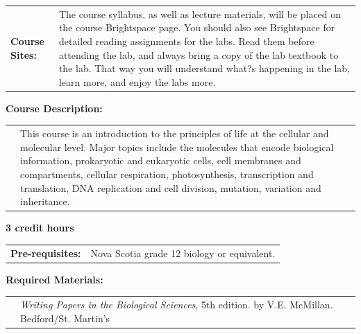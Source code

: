 \documentclass[hidelinks]{article}
\begin{document}
	
	\begin{tabular}{@{} p{2.3cm} p{13.9cm}}
		\textbf{Course Sites:} & The course syllabus, as well as lecture materials, will be placed on the course Brightspace page. You should also see Brightspace for detailed reading assignments for the labs. Read them before attending the lab, and always bring a copy of the lab textbook to the lab. That way you will understand what?s happening in the lab, learn more, and enjoy the labs more.\\
	\end{tabular}


	\textbf{Course Description:}\\
	\begin{tabular}{@{} p{2.3cm} p{13.9cm}}
		 & This course is an introduction to the principles of life at the cellular and molecular level. Major topics include the molecules that encode biological information, prokaryotic and eukaryotic cells, cell membranes and compartments, cellular respiration, photosynthesis, transcription and translation, DNA replication and cell division, mutation, variation and inheritance.
	\end{tabular}

	\textbf{3 credit hours}

	\begin{tabular}{@{} p{2.6cm} l }
		\textbf{Pre-requisites:} & Nova Scotia grade 12 biology or equivalent. 
	\end{tabular}

	\textbf{Required Materials:}\\
	\begin{tabular}{@{} p{2.3cm} p{13.9cm}}
		& \emph{Writing Papers in the Biological Sciences}, 5th edition. by V.E. McMillan. Bedford/St. Martin's
	\end{tabular}	
\end{document}
